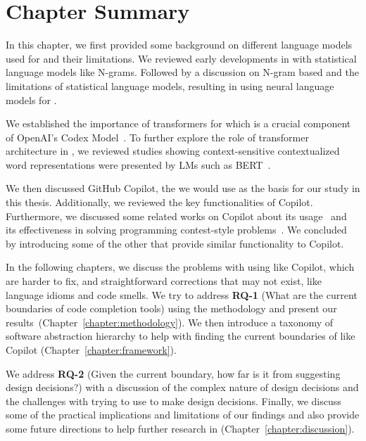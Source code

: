 \section{Chapter Summary}
In this chapter, we first provided some background on different language models used for \cct{} and their limitations. We reviewed early developments in \cct{} with statistical language models like N-grams. Followed by a discussion on N-gram based \cct{} and the limitations of statistical language models, resulting in using neural language models for \cct{}.

We established the importance of transformers for \cct{} which is a crucial component of OpenAI's Codex Model~\cite{copilot}. To further explore the role of transformer architecture in \cct{}, we reviewed studies showing context-sensitive contextualized word representations were presented by LMs such as BERT~\cite{bert}.

We then discussed GitHub Copilot, the \cct{} we would use as the basis for our study in this thesis. Additionally, we reviewed the key functionalities of Copilot.
Furthermore, we discussed some related works on Copilot about its usage~\cite{Vaithilingam2022} and its effectiveness in solving programming contest-style problems~\cite{empirical_eval}. We concluded by introducing some of the other \cct{} that provide similar functionality to Copilot.

In the following chapters, we discuss the problems with using \cct{} like Copilot, which are harder to fix, and straightforward corrections that may not exist, like language idioms and code smells. 
We try to address \textbf{RQ-1} (What are the current boundaries of code completion tools) using the methodology and present our results~(Chapter~\ref{chapter:methodology}).
We then introduce a taxonomy of software abstraction hierarchy to help with finding the current boundaries of \cct{} like Copilot (Chapter~\ref{chapter:framework}). 

We address \textbf{RQ-2} (Given the current boundary, how far is it from suggesting design decisions?) with a discussion of the complex nature of design decisions and the challenges with trying to use \cct{} to make design decisions.
Finally, we discuss some of the practical implications and limitations of our findings and also provide some future directions to help further research in \cct{} (Chapter~\ref{chapter:discussion}).